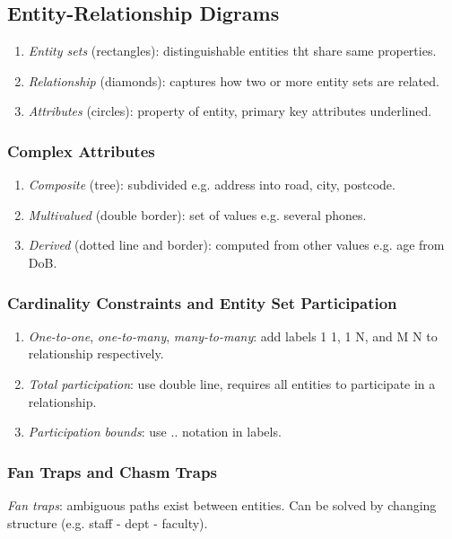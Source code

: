 \documentclass[twocolumn,english]{article}
\begin{document}
\subsection{Entity-Relationship Digrams}
\begin{enumerate}
\item \emph{Entity sets} (rectangles): distinguishable entities tht share
same properties.
\item \emph{Relationship} (diamonds): captures how two or more entity sets
are related.
\item \emph{Attributes} (circles): property of entity, primary key attributes
underlined.
\end{enumerate}

\subsubsection{Complex Attributes}
\begin{enumerate}
\item \emph{Composite} (tree): subdivided e.g. address into road, city,
postcode.
\item \emph{Multivalued} (double border): set of values e.g. several phones.
\item \emph{Derived} (dotted line and border): computed from other values
e.g. age from DoB.
\end{enumerate}

\subsubsection{Cardinality Constraints and Entity Set Participation}
\begin{enumerate}
\item \emph{One-to-one}, \emph{one-to-many}, \emph{many-to-many}: add labels
1 1, 1 N, and M N to relationship respectively.
\item \emph{Total participation}: use double line, requires all entities
to participate in a relationship.
\item \emph{Participation bounds}: use .. notation in labels.
\end{enumerate}

\subsubsection{Fan Traps and Chasm Traps}

\emph{Fan traps}: ambiguous paths exist between entities. Can be solved
by changing structure (e.g. staff - dept - faculty).
\end{document}
